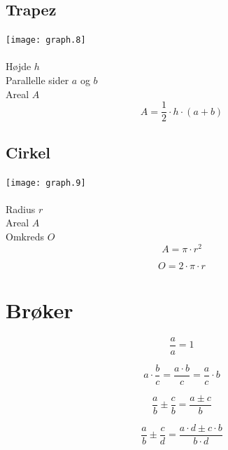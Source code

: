 \documentclass[11pt,a5paper,fleqn,leqno]{book}
\begin{document}
\subsection{Trapez}

\texttt{[image: graph.8]}
\\
\\
Højde $h$ \\
Parallelle sider $a$ og $b$ \\
Areal $A$
\begin{equation}
A = \frac{1}{2} \cdot h \cdot (a + b)
\end{equation}

\subsection{Cirkel}

\texttt{[image: graph.9]}
\\
\\
Radius $r$ \\
Areal $A$ \\
Omkreds $O$
\begin{equation}
A = \pi \cdot r^2
\end{equation}

\begin{equation}
O = 2 \cdot \pi \cdot r
\end{equation}

\section{Brøker}

\begin{equation} \label{eq:taeller_naevner_det_samme}
\frac{a}{a} = 1
\end{equation}

\begin{equation} \label{eq:konstant_gange_med_broek}
a \cdot \frac{b}{c} = \frac{a \cdot b}{c} = \frac{a}{c} \cdot b
\end{equation}

\begin{equation} \label{eq:broeker_med_ens_naevnere_plusminus}
\frac{a}{b} \pm \frac{c}{b} = \frac{a \pm c}{b}
\end{equation}

\begin{equation} \label{eq:broeker_med_forskellige_naevnere_plusminus}
\frac{a}{b} \pm \frac{c}{d} = \frac{a \cdot d \pm c \cdot b}{b \cdot d}
\end{equation}
\end{document}
